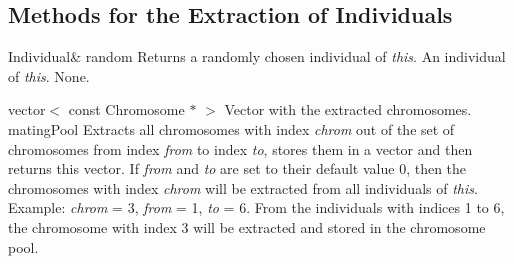 \subsection{Methods for the Extraction of Individuals}

\setNormalInstance
\printEmptyMethodReturnSpecial
{Individual\&}
{random}
{Returns a randomly chosen individual of {\em this}.}
{An individual of {\em this}.}
{None.}

\vspace*{4ex}

\setConstInstance
\setCorrectWidthThree{8pt}
\printMethodWithParamsSaved
{vector$<$ const Chromosome $\ast$ $>$}
{Vector with the extracted chromosomes.}
{matingPool}
{Extracts all chromosomes with index {\em chrom} out of the set
 of chromosomes from index {\em from} to index {\em to}, stores
 them in a vector and then returns this vector. If {\em from}
 and {\em to} are set to their default value 0, then the
 chromosomes with index {\em chrom} will be extracted from all
 individuals of {\em this}.\\
 Example: {\em chrom} = 3, {\em from} = 1, {\em to} = 6. From
 the individuals with indices 1 to 6, the chromosome with index
 3 will be extracted and stored in the chromosome pool.}
{}
\setCorrectWidthThree{4pt}
